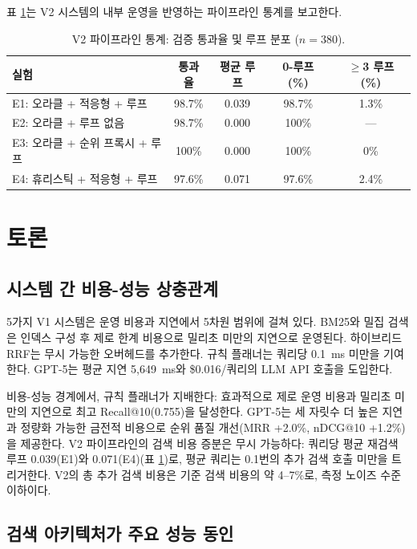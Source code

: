 \documentclass[11pt, a4paper]{article}
\begin{document}
표 \ref{tab:pipeline}는 V2 시스템의 내부 운영을 반영하는 파이프라인 통계를 보고한다.

\begin{table}[htbp]
\centering
\caption{V2 파이프라인 통계: 검증 통과율 및 루프 분포 ($n{=}380$).}
\label{tab:pipeline}
\begin{tabular}{lcccc}
\toprule
\textbf{실험} & \textbf{통과율} & \textbf{평균 루프} & \textbf{0-루프 (\%)} & \textbf{$\geq$3 루프 (\%)} \\
\midrule
E1: 오라클 + 적응형 + 루프    & 98.7\% & 0.039 & 98.7\% & 1.3\% \\
E2: 오라클 + 루프 없음        & 98.7\% & 0.000 & 100\%  & ---  \\
E3: 오라클 + 순위 프록시 + 루프 & 100\% & 0.000 & 100\%  & 0\%  \\
E4: 휴리스틱 + 적응형 + 루프  & 97.6\% & 0.071 & 97.6\% & 2.4\% \\
\bottomrule
\end{tabular}
\end{table}

\section{토론}
\label{sec:discussion}

\subsection{시스템 간 비용-성능 상충관계}

5가지 V1 시스템은 운영 비용과 지연에서 5차원 범위에 걸쳐 있다. BM25와 밀집 검색은 인덱스 구성 후 제로 한계 비용으로 밀리초 미만의 지연으로 운영된다. 하이브리드 RRF는 무시 가능한 오버헤드를 추가한다. 규칙 플래너는 쿼리당 0.1~ms 미만을 기여한다. GPT-5는 평균 지연 5,649~ms와 \$0.016/쿼리의 LLM API 호출을 도입한다.

비용-성능 경계에서, 규칙 플래너가 지배한다: 효과적으로 제로 운영 비용과 밀리초 미만의 지연으로 최고 Recall@10(0.755)을 달성한다. GPT-5는 세 자릿수 더 높은 지연과 정량화 가능한 금전적 비용으로 순위 품질 개선(MRR +2.0\%, nDCG@10 +1.2\%)을 제공한다. V2 파이프라인의 검색 비용 증분은 무시 가능하다: 쿼리당 평균 재검색 루프 0.039(E1)와 0.071(E4)(표 \ref{tab:pipeline})로, 평균 쿼리는 0.1번의 추가 검색 호출 미만을 트리거한다. V2의 총 추가 검색 비용은 기준 검색 비용의 약 4--7\%로, 측정 노이즈 수준 이하이다.

\subsection{검색 아키텍처가 주요 성능 동인}
\end{document}
